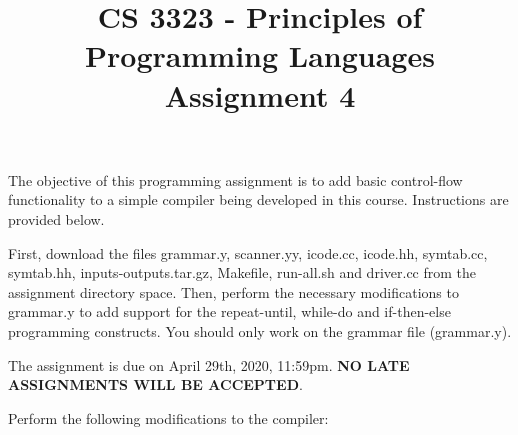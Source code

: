 \documentclass[letter,10pt]{article}
\title{CS 3323 - Principles of Programming Languages\\ Assignment 4}
\date{}
\begin{document}
\maketitle

The objective of this programming assignment is to add basic control-flow functionality 
to a simple compiler being developed in this course. Instructions are provided below.

First, download the files 
grammar.y, scanner.yy, icode.cc, icode.hh, symtab.cc, symtab.hh, inputs-outputs.tar.gz, Makefile, run-all.sh and driver.cc 
from the assignment directory space. 
Then, perform the necessary modifications
to grammar.y to add support for the repeat-until, while-do and if-then-else programming constructs. 
You should only work on the grammar file (grammar.y).

The assignment is due on April 29th, 2020, 11:59pm. {\bf NO LATE ASSIGNMENTS WILL BE ACCEPTED}.

Perform the following modifications to the compiler:
\end{document}
